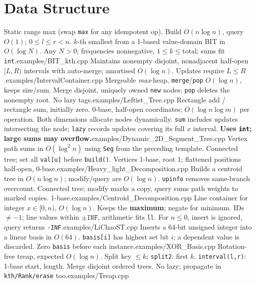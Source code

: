 \section{Data Structure}
%
{Static range max (swap \texttt{max} for any idempotent op). Build $O(n\log n)$, query $O(1)$; $0\le l\le r<n$.}
%
{$k$-th smallest from a 1-based value-domain BIT in $O(\log N)$. Any $N>0$; frequencies nonnegative, $1\le k\le\mathrm{total}$; sums fit \texttt{int}.}{examples/BIT_kth.cpp}
%
{Maintains nonempty disjoint, nonadjacent half-open $[L,R)$ intervals with auto-merge; amortised $O(\log n)$. Updates require $L\le R$.}{examples/IntervalContainer.cpp}
%
{Mergeable \emph{max}-heap, \texttt{merge}/\texttt{pop} $O(\log n)$, keeps size/sum. Merge disjoint, uniquely owned \texttt{new} nodes; \texttt{pop} deletes the nonempty root. No lazy tags.}{examples/Leftist_Tree.cpp}
%
{Rectangle add / rectangle sum, initially zero. 0-base, half-open coordinates; $O(\log n\log m)$ per operation. Both dimensions allocate nodes dynamically. \texttt{sum} includes updates intersecting the node; \texttt{lazy} records updates covering its full $x$ interval. \textbf{Uses \texttt{int}; large sums may overflow.}}{examples/Dynamic_2D_Segment_Tree.cpp}
%
{Vertex path sums in $O(\log^2 n)$ using \texttt{Seg} from the preceding template. Connected tree; set all \texttt{val[u]} before \texttt{build()}. Vertices 1-base, root 1; flattened positions half-open, 0-base.}{examples/Heavy_light_Decomposition.cpp}
%
{Builds a centroid tree in $O(n\log n)$; modify/query are $O(\log n)$. \texttt{upinfo} removes same-branch overcount. Connected tree; modify marks a copy, query sums path weights to marked copies. 1-base.}{examples/Centroid_Decomposition.cpp}
%
{Line container for integer $x\in[0,n)$, $O(\log n)$. Keeps the \textbf{maximum}; negate for minimum. IDs $\ne-1$; line values within $\pm\texttt{INF}$, arithmetic fits \texttt{ll}. For $n\le0$, insert is ignored, query returns \texttt{-INF}.}{examples/LiChaoST.cpp}
%
{Inserts a 64-bit unsigned integer into a linear basis in $O(64)$. \texttt{basis[i]} has highest set bit $i$; a dependent value is discarded. Zero \texttt{basis} before each instance.}{examples/XOR_Basis.cpp}
%
{Rotation-free treap, expected $O(\log n)$. Split key $\le k$; \texttt{split2}: first $k$. \texttt{interval(l,r)}: 1-base start, length. Merge disjoint ordered trees. No lazy; propagate in \texttt{kth/Rank/erase} too.}{examples/Treap.cpp}


